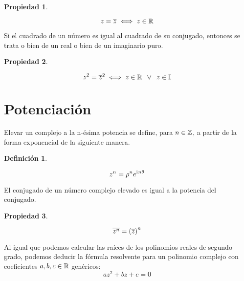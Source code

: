 \documentclass[a5paper,12pt,twoside]{book}
\newtheorem{defn}{{Definición}}[chapter]
\newtheorem{prop}{{Propiedad}}[chapter]
\begin{document}
\begin{mdframed}[style=MyFrame1]
    \begin{prop}
    \end{prop}
    \begin{equation*}
        z = \overline{z} \iff z \in \mathbb{R}
    \end{equation*}
\end{mdframed}

Si el cuadrado de un número es igual al cuadrado de su conjugado, entonces se trata o bien de un real o bien de un imaginario puro.

\begin{mdframed}[style=MyFrame1]
    \begin{prop}
    \end{prop}
    \begin{equation*}
        z^2=\overline{z}^2 \iff z \in \mathbb{R} \enspace \lor \enspace z \in \mathbb{I}
    \end{equation*}
\end{mdframed}


\section{Potenciación}

Elevar un complejo a la n-ésima potencia se define, para $n \in \mathbb{Z}$, a partir de la forma exponencial de la siguiente manera.

\begin{mdframed}[style=MyFrame1]
    \begin{defn}
        \label{defn:nPower}
    \end{defn}
    \begin{equation*}
        z^n = \rho^n e^{\mathrm{i}\mkern1mu n \theta}
    \end{equation*}
\end{mdframed}

El conjugado de un número complejo elevado es igual a la potencia del conjugado.

\begin{mdframed}[style=MyFrame1]
    \begin{prop}
    \end{prop}
    \begin{equation*}
        \overline{z^n} = \left( \overline{z} \right)^n
    \end{equation*}
\end{mdframed}

Al igual que podemos calcular las raíces de los polinomios reales de segundo grado, podemos deducir la fórmula resolvente para un polinomio complejo con coeficientes $a,b,c \in \mathbb{R}$ genéricos:
\begin{equation*}
    az^2 + bz + c = 0
\end{equation*}
\end{document}
